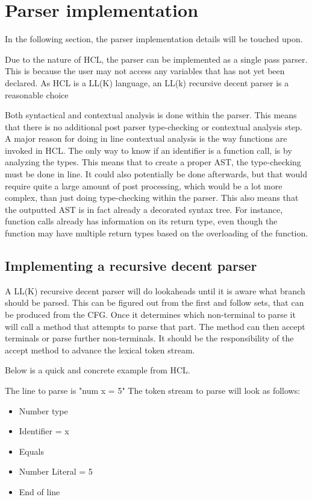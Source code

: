 \section{Parser implementation}
\label{parserImplemention}
In the following section, the parser implementation details will be touched upon.

Due to the nature of HCL, the parser can be implemented as a single pass parser. 
This is because the user may not access any variables that has not yet been declared. 
As HCL is a LL(K) language, an LL(k) recursive decent parser is a reasonable choice

Both syntactical and contextual analysis is done within the parser. 
This means that there is no additional post parser type-checking or contextual analysis step. 
A major reason for doing in line contextual analysis is the way functions are invoked in HCL. 
The only way to know if an identifier is a function call, is by analyzing the types. 
This means that to create a proper AST, the type-checking must be done in line. 
It could also potentially be done afterwards, but that would require quite a large amount of post processing, which would be a lot more complex, than just doing type-checking within the parser. 
This also means that the outputted AST is in fact already a decorated syntax tree. 
For instance, function calls already has information on its return type, even though the function may have multiple return types based on the overloading of the function.

\subsection{Implementing a recursive decent parser}
A LL(K) recursive decent parser will do lookaheads until it is aware what branch should be parsed.
This can be figured out from the first and follow sets, that can be produced from the CFG.
Once it determines which non-terminal to parse it will call a method that attempts to parse that part.
The method can then accept terminals or parse further non-terminals.
It should be the responsibility of the accept method to advance the lexical token stream.

Below is a quick and concrete example from HCL. 

The line to parse is "num x = 5" The token stream to parse will look as follows:

\begin{itemize}
	\item Number type
	\item Identifier = x
	\item Equals
	\item Number Literal = 5
	\item End of line
\end{itemize}

